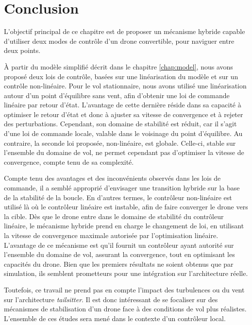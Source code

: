 \section{Conclusion}

L'objectif principal de ce chapitre est de proposer un mécanisme hybride capable d'utiliser deux modes de contrôle d'un drone convertible, pour naviguer entre deux points. 

À partir du modèle simplifié décrit dans le chapitre \ref{chap:model}, nous avons proposé deux lois de contrôle, basées sur une linéarisation du modèle et sur un contrôle non-linéaire.
Pour le vol stationnaire, nous avons utilisé une linéarisation autour d'un point d'équilibre sans vent, afin d'obtenir une loi de commande linéaire par retour d'état. L'avantage de cette dernière réside dans sa capacité à optimiser le retour d'état et donc à ajuster sa vitesse de convergence et à rejeter des perturbations.  Cependant, son domaine de stabilité est réduit, car il s'agit d'une loi de commande locale, valable dans le voisinage du point d'équilibre. Au contraire, la seconde loi proposée, non-linéaire, est globale. Celle-ci, stable sur l'ensemble du domaine de vol, ne permet cependant pas d'optimiser la vitesse de convergence, compte tenu de sa complexité.

Compte tenu des avantages et des inconvénients observés dans les lois de commande, il a semblé approprié d'envisager une transition hybride sur la base de la stabilité de la boucle. En d'autres termes, le contrôleur non-linéaire est utilisé là où le contrôleur linéaire est instable, afin de faire converger le drone vers la cible. Dès que le drone entre dans le domaine de stabilité du contrôleur linéaire, le mécanisme hybride prend en charge le changement de loi, en utilisant la vitesse de convergence maximale autorisée par l'optimisation linéaire. L'avantage de ce mécanisme est qu'il fournit un contrôleur ayant autorité sur l'ensemble du domaine de vol, assurant la convergence, tout en optimisant les capacités du drone. Bien que les premiers résultats ne soient obtenus que par simulation, ils semblent prometteurs pour une intégration sur l'architecture réelle.

Toutefois, ce travail ne prend pas en compte l'impact des turbulences ou du vent sur l'architecture \textit{tailsitter}. Il est donc intéressant de se focaliser sur des mécanismes de stabilisation d'un drone face à des conditions de vol plus réalistes. L'ensemble de ces études sera mené dans le contexte d'un contrôleur local.


